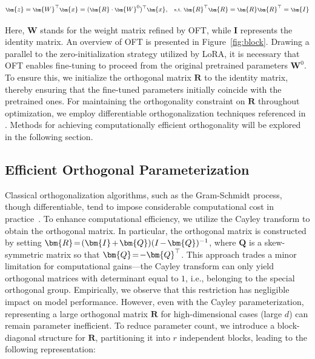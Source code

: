 \begin{equation}\label{eq:oft_general}
    \footnotesize
    \bm{z} = \bm{W}^\top\bm{x} = (\bm{R} \cdot \bm{W}^0)^\top\bm{x},~~~\text{s.t.}~\bm{R}^\top\bm{R} = \bm{R}\bm{R}^\top = \bm{I}
\end{equation}

Here, $\bm{W}$ stands for the weight matrix refined by OFT, while $\bm{I}$ represents the identity matrix. An overview of OFT is presented in Figure~\ref{fig:block}. Drawing a parallel to the zero-initialization strategy utilized by LoRA, it is necessary that OFT enables fine-tuning to proceed from the original pretrained parameters $\bm{W}^0$. To ensure this, we initialize the orthogonal matrix $\bm{R}$ to the identity matrix, thereby ensuring that the fine-tuned parameters initially coincide with the pretrained ones. For maintaining the orthogonality constraint on $\bm{R}$ throughout optimization, we employ differentiable orthogonalization techniques referenced in \cite{liu2021orthogonal,lezcano2019cheap}. Methods for achieving computationally efficient orthogonality will be explored in the following section.

\subsection{Efficient Orthogonal Parameterization}\label{sect:eff_ortho}

Classical orthogonalization algorithms, such as the Gram-Schmidt process, though differentiable, tend to impose considerable computational cost in practice~\cite{liu2021orthogonal}. To enhance computational efficiency, we utilize the Cayley transform to obtain the orthogonal matrix. In particular, the orthogonal matrix is constructed by setting $\thickmuskip=2mu \medmuskip=2mu \bm{R} = (\bm{I} + \bm{Q})(I - \bm{Q})^{-1}$, where $\bm{Q}$ is a skew-symmetric matrix so that $\thickmuskip=2mu \medmuskip=2mu \bm{Q} = -\bm{Q}^\top$. This approach trades a minor limitation for computational gains—the Cayley transform can only yield orthogonal matrices with determinant equal to $1$, i.e., belonging to the special orthogonal group. Empirically, we observe that this restriction has negligible impact on model performance. However, even with the Cayley parameterization, representing a large orthogonal matrix $\bm{R}$ for high-dimensional cases (large $d$) can remain parameter inefficient. To reduce parameter count, we introduce a block-diagonal structure for $\bm{R}$, partitioning it into $r$ independent blocks, leading to the following representation:

